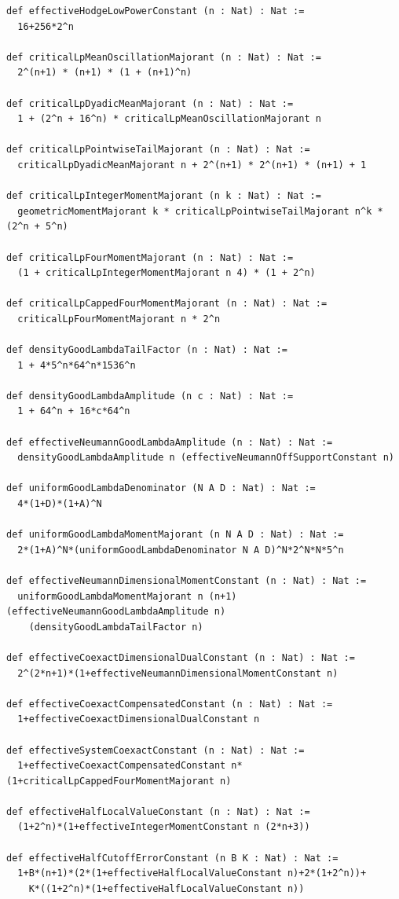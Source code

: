 \documentclass[reqno,11pt]{amsart}
\numberwithin{equation}{section}
\theoremstyle{definition}
\theoremstyle{remark}
\begin{document}
\begin{lstlisting}
def effectiveHodgeLowPowerConstant (n : Nat) : Nat :=
  16+256*2^n

def criticalLpMeanOscillationMajorant (n : Nat) : Nat :=
  2^(n+1) * (n+1) * (1 + (n+1)^n)

def criticalLpDyadicMeanMajorant (n : Nat) : Nat :=
  1 + (2^n + 16^n) * criticalLpMeanOscillationMajorant n

def criticalLpPointwiseTailMajorant (n : Nat) : Nat :=
  criticalLpDyadicMeanMajorant n + 2^(n+1) * 2^(n+1) * (n+1) + 1

def criticalLpIntegerMomentMajorant (n k : Nat) : Nat :=
  geometricMomentMajorant k * criticalLpPointwiseTailMajorant n^k * (2^n + 5^n)

def criticalLpFourMomentMajorant (n : Nat) : Nat :=
  (1 + criticalLpIntegerMomentMajorant n 4) * (1 + 2^n)

def criticalLpCappedFourMomentMajorant (n : Nat) : Nat :=
  criticalLpFourMomentMajorant n * 2^n

def densityGoodLambdaTailFactor (n : Nat) : Nat :=
  1 + 4*5^n*64^n*1536^n

def densityGoodLambdaAmplitude (n c : Nat) : Nat :=
  1 + 64^n + 16*c*64^n

def effectiveNeumannGoodLambdaAmplitude (n : Nat) : Nat :=
  densityGoodLambdaAmplitude n (effectiveNeumannOffSupportConstant n)

def uniformGoodLambdaDenominator (N A D : Nat) : Nat :=
  4*(1+D)*(1+A)^N

def uniformGoodLambdaMomentMajorant (n N A D : Nat) : Nat :=
  2*(1+A)^N*(uniformGoodLambdaDenominator N A D)^N*2^N*N*5^n

def effectiveNeumannDimensionalMomentConstant (n : Nat) : Nat :=
  uniformGoodLambdaMomentMajorant n (n+1) (effectiveNeumannGoodLambdaAmplitude n)
    (densityGoodLambdaTailFactor n)

def effectiveCoexactDimensionalDualConstant (n : Nat) : Nat :=
  2^(2*n+1)*(1+effectiveNeumannDimensionalMomentConstant n)

def effectiveCoexactCompensatedConstant (n : Nat) : Nat :=
  1+effectiveCoexactDimensionalDualConstant n

def effectiveSystemCoexactConstant (n : Nat) : Nat :=
  1+effectiveCoexactCompensatedConstant n*(1+criticalLpCappedFourMomentMajorant n)

def effectiveHalfLocalValueConstant (n : Nat) : Nat :=
  (1+2^n)*(1+effectiveIntegerMomentConstant n (2*n+3))

def effectiveHalfCutoffErrorConstant (n B K : Nat) : Nat :=
  1+B*(n+1)*(2*(1+effectiveHalfLocalValueConstant n)+2*(1+2^n))+
    K*((1+2^n)*(1+effectiveHalfLocalValueConstant n))


\end{lstlisting}
\end{document}
